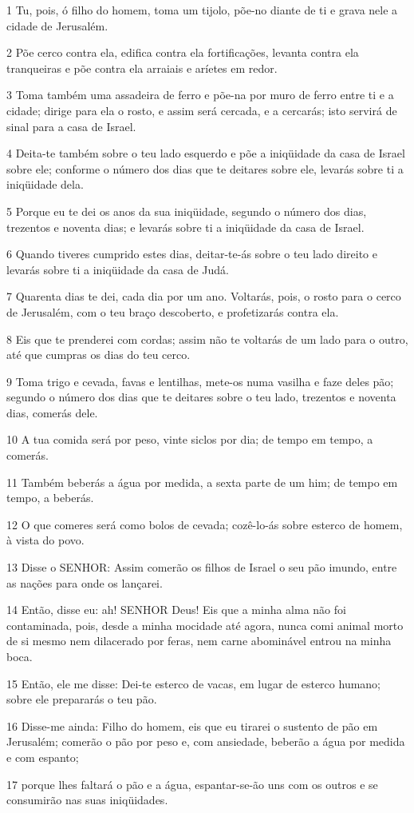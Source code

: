 \par 1 Tu, pois, ó filho do homem, toma um tijolo, põe-no diante de ti e grava nele a cidade de Jerusalém.
\par 2 Põe cerco contra ela, edifica contra ela fortificações, levanta contra ela tranqueiras e põe contra ela arraiais e aríetes em redor.
\par 3 Toma também uma assadeira de ferro e põe-na por muro de ferro entre ti e a cidade; dirige para ela o rosto, e assim será cercada, e a cercarás; isto servirá de sinal para a casa de Israel.
\par 4 Deita-te também sobre o teu lado esquerdo e põe a iniqüidade da casa de Israel sobre ele; conforme o número dos dias que te deitares sobre ele, levarás sobre ti a iniqüidade dela.
\par 5 Porque eu te dei os anos da sua iniqüidade, segundo o número dos dias, trezentos e noventa dias; e levarás sobre ti a iniqüidade da casa de Israel.
\par 6 Quando tiveres cumprido estes dias, deitar-te-ás sobre o teu lado direito e levarás sobre ti a iniqüidade da casa de Judá.
\par 7 Quarenta dias te dei, cada dia por um ano. Voltarás, pois, o rosto para o cerco de Jerusalém, com o teu braço descoberto, e profetizarás contra ela.
\par 8 Eis que te prenderei com cordas; assim não te voltarás de um lado para o outro, até que cumpras os dias do teu cerco.
\par 9 Toma trigo e cevada, favas e lentilhas, mete-os numa vasilha e faze deles pão; segundo o número dos dias que te deitares sobre o teu lado, trezentos e noventa dias, comerás dele.
\par 10 A tua comida será por peso, vinte siclos por dia; de tempo em tempo, a comerás.
\par 11 Também beberás a água por medida, a sexta parte de um him; de tempo em tempo, a beberás.
\par 12 O que comeres será como bolos de cevada; cozê-lo-ás sobre esterco de homem, à vista do povo.
\par 13 Disse o SENHOR: Assim comerão os filhos de Israel o seu pão imundo, entre as nações para onde os lançarei.
\par 14 Então, disse eu: ah! SENHOR Deus! Eis que a minha alma não foi contaminada, pois, desde a minha mocidade até agora, nunca comi animal morto de si mesmo nem dilacerado por feras, nem carne abominável entrou na minha boca.
\par 15 Então, ele me disse: Dei-te esterco de vacas, em lugar de esterco humano; sobre ele prepararás o teu pão.
\par 16 Disse-me ainda: Filho do homem, eis que eu tirarei o sustento de pão em Jerusalém; comerão o pão por peso e, com ansiedade, beberão a água por medida e com espanto;
\par 17 porque lhes faltará o pão e a água, espantar-se-ão uns com os outros e se consumirão nas suas iniqüidades.

